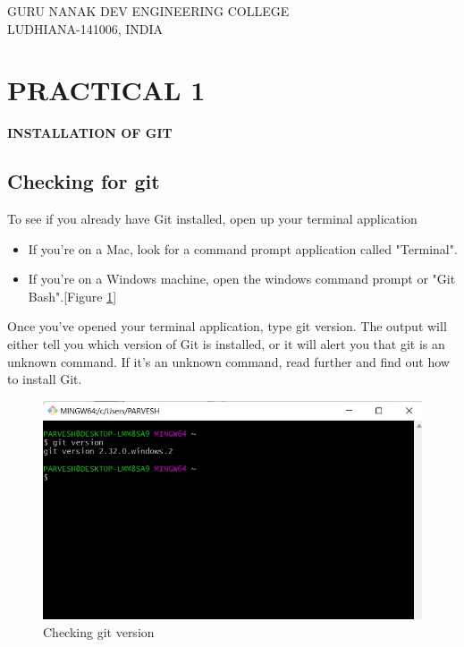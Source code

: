 \documentclass[12pt]{article}
\begin{document}
\begin{titlepage}
\begin{tabular}{m{18em} m{15em}}
\end{tabular}

\vspace{3\baselineskip}





\uppercase{Guru Nanak Dev Engineering college\\
Ludhiana-141006, India}
\thispagestyle{empty}
\end{titlepage}
\clearpage
\tableofcontents
\thispagestyle{empty}
\clearpage


\section{PRACTICAL 1}
\setcounter{page}{1}
{\bfseries INSTALLATION OF GIT}
\subsection{Checking for git}
To see if you already have Git installed, open up your terminal application
\begin{itemize}
\item If you're on a Mac, look for a command prompt application called "Terminal".
\item If you're on a Windows machine, open the windows command prompt or "Git Bash".[Figure \ref{gitversion}]
\end{itemize}

\noindent
Once you've opened your terminal application, type git version. The output will either tell you which version of Git is installed, or it will alert you that git is an unknown command. If it's an unknown command, read further and find out how to install Git.


\begin{figure}[H]
\centering
\includegraphics[scale=1]{gitversion}
\caption{Checking git version}
\label{gitversion}
\vspace{0.6\baselineskip}
\end{figure}
\end{document}
